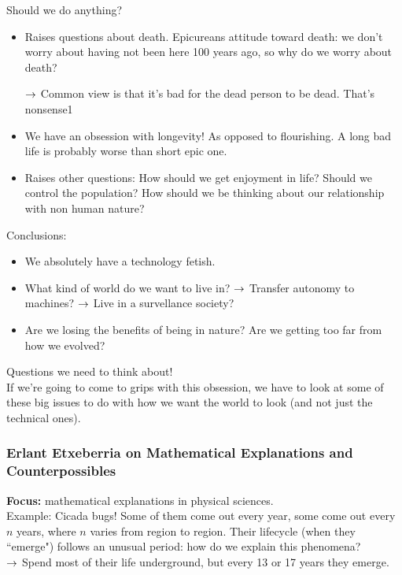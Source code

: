 Should we do anything?
\begin{itemize}
\item Raises questions about death. Epicureans attitude toward death: we don't worry about having not been here 100 years ago, so why do we worry about death?

$\rightarrow$ Common view is that it's bad for the dead person to be dead. That's nonsense1

\item We have an obsession with longevity! As opposed to flourishing. A long bad life is probably worse than short epic one.

\item Raises other questions: How should we get enjoyment in life? Should we control the population? How should we be thinking about our relationship with non human nature?
\end{itemize}

Conclusions:
\begin{itemize}
	\item We absolutely have a technology fetish.
	\item What kind of world do we want to live in?
	$\rightarrow$ Transfer autonomy to machines?
	$\rightarrow$ Live in a survellance society?
	\item Are we losing the benefits of being in nature? Are we getting too far from how we evolved?
	\end{itemize}
Questions we need to think about! \\

If we're going to come to grips with this obsession, we have to look at some of these big issues to do with how we want the world to look (and not just the technical ones).


\spacerule


\subsubsection{Erlant Etxeberria on Mathematical Explanations and Counterpossibles}

{\bf Focus:} mathematical explanations in physical sciences. \\

Example: Cicada bugs! Some of them come out every year, some come out every $n$ years, where $n$ varies from region to region. Their lifecycle (when they ``emerge") follows an unusual period: how do we explain this phenomena? \\

$\rightarrow$ Spend most of their life underground, but every 13 or 17 years they emerge. \\

